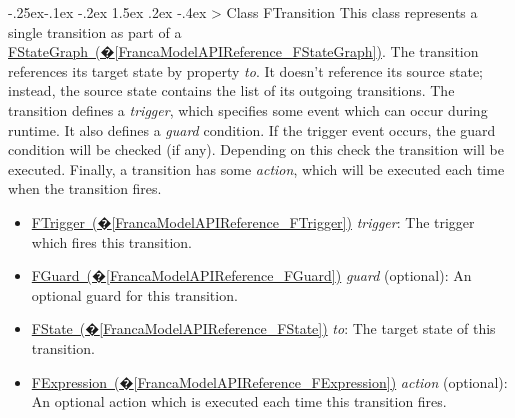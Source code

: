 \documentclass[a4paper,10pt]{scrreprt}
\makeatletter
\renewcommand\subsection{\medskip\@startsection{subsection}{2}{\z@}%
  {-.25ex\@plus -.1ex \@minus -.2ex}%
  {1.5ex \@plus .2ex \@minus -.4ex}%
  {\ifnum \scr@compatibility>\@nameuse{scr@v@2.96}\relax
    \setlength{\parfillskip}{\z@ plus 1fil}\fi
    \raggedsection\normalfont\sectfont\nobreak\size@subsection
  }%
}
\newlength{\XdocItemIndent}
\makeatother
\begin{document}
\subsection{Class FTransition}
\label{FrancaModelAPIReference_FTransition}
This class represents a single transition as part of a 
\hyperref[FrancaModelAPIReference_FStateGraph]{FStateGraph~(�\ref*{FrancaModelAPIReference_FStateGraph})}.
The transition references its target state by property \textit{to}. 
It doesn't reference its source state; instead, the source state contains
the list of its outgoing transitions.
The transition defines a \textit{trigger}, which specifies some event which
can occur during runtime. It also defines a \textit{guard} condition.
If the trigger event occurs, the guard condition will be checked (if any).
Depending on this check the transition will be executed.
Finally, a transition has some \textit{action}, which will be executed
each time when the transition fires.
\setlength{\XdocItemIndent}{\textwidth}
\begin{itemize}
\addtolength{\XdocItemIndent}{-2.5em}
\item \begin{minipage}[t]{\XdocItemIndent}
\hyperref[FrancaModelAPIReference_FTrigger]{FTrigger~(�\ref*{FrancaModelAPIReference_FTrigger})} \textit{trigger}: The trigger which fires this transition.

\end{minipage}
\item \begin{minipage}[t]{\XdocItemIndent}
\hyperref[FrancaModelAPIReference_FGuard]{FGuard~(�\ref*{FrancaModelAPIReference_FGuard})} \textit{guard} (optional): An optional guard for this transition.

\end{minipage}
\item \begin{minipage}[t]{\XdocItemIndent}
\hyperref[FrancaModelAPIReference_FState]{FState~(�\ref*{FrancaModelAPIReference_FState})} \textit{to}: The target state of this transition.

\end{minipage}
\item \begin{minipage}[t]{\XdocItemIndent}
\hyperref[FrancaModelAPIReference_FExpression]{FExpression~(�\ref*{FrancaModelAPIReference_FExpression})} \textit{action} (optional): An optional action which is executed each time this transition fires.

\end{minipage}
\end{itemize}
\addtolength{\XdocItemIndent}{2.5em}
\end{document}
